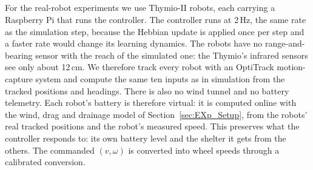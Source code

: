 %
%

\subsection{\texorpdfstring{}{Real-Robot Setup}}
\label{sec:hardware_setup}
\begingroup\color{red}
For the real-robot experiments we use Thymio-II robots, each carrying a Raspberry Pi that runs
the controller. The controller runs at 2\,Hz, the same rate as the simulation step, because
the Hebbian update is applied once per step and a faster rate would change its learning
dynamics. The robots have no range-and-bearing sensor with the reach of the simulated one:
the Thymio's infrared sensors see only about 12\,cm. We therefore track every robot with an
OptiTrack motion-capture system and compute the same ten inputs as in simulation from the
tracked positions and headings. There is also no wind tunnel and no battery telemetry.
Each robot's battery is therefore virtual: it is computed online with the wind, drag and
drainage model of Section~\ref{sec:EXp_Setup}, from the robots' real tracked positions and
the robot's measured speed. This preserves what the controller responds to: its own battery
level and the shelter it gets from the others. The commanded $(v, \omega)$ is converted into
wheel speeds through a calibrated conversion.

